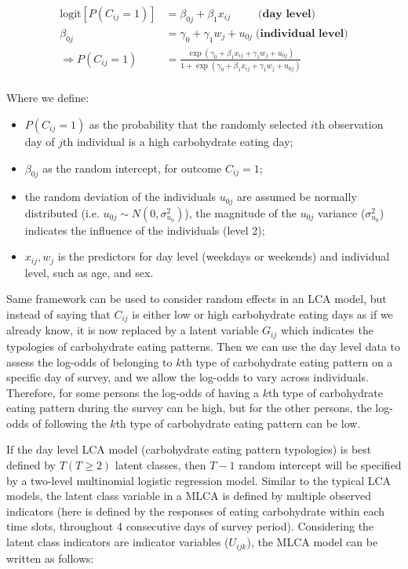 \begin{equation}
\begin{aligned}
\text{logit}[P(C_{ij} = 1)] & = \beta_{0j} + \beta_{1}x_{ij} \;\;\;\;\;\;\;\;\; \textbf{(day level)}  \\
\beta_{0j} & = \gamma_0 + \gamma_1 w_j + u_{0j} \; \textbf{(individual level)} \\ 
\Rightarrow P(C_{ij} = 1) & = \frac{\exp{(\gamma_0 + \beta_{1}x_{ij} + \gamma_1 w_j + u_{0j})}}{1 + \exp{(\gamma_0 + \beta_{1}x_{ij} + \gamma_1 w_j + u_{0j})}} \\
\end{aligned}
\label{randomLCA}
\end{equation}
\vspace{-0.3cm}

Where we define: 

\begin{itemize}
	\item $P(C_{ij} = 1)$ as the probability that the randomly selected $i$th observation day of $j$th individual is a high carbohydrate eating day;
	\item $\beta_{0j}$ as the random intercept, for outcome $C_{ij} = 1$; 
	\item the random deviation of the individuals $u_{0j}$ are assumed be normally distributed (i.e. $u_{0j} \sim N(0, \sigma_{u_0}^2)$), the magnitude of the $u_{0j}$ variance ($\sigma_{u_0}^2$) indicates the influence of the individuals (level 2);
	\item $x_{ij}, w_j$ is the predictors for day level (weekdays or weekends) and individual level, such as age, and sex.
\end{itemize}



Same framework can be used to consider random effects in an LCA model, but instead of saying that $C_{ij}$ is either low or high carbohydrate eating days as if we already know, it is now replaced by a latent variable $G_{ij}$ which indicates the typologies of carbohydrate eating patterns. Then we can use the day level data to assess the log-odds of belonging to $k$th type of carbohydrate eating pattern on a specific day of survey, and we allow the log-odds to vary across individuals. Therefore, for some persons the log-odds of having a $k$th type of carbohydrate eating pattern during the survey can be high, but for the other persons, the log-odds of following the $k$th type of carbohydrate eating pattern can be low. 

If the day level LCA model (carbohydrate eating pattern typologies) is best defined by $T (T \geqslant 2)$ latent classes, then $T-1$ random intercept will be specified by a two-level multinomial logistic regression model. Similar to the typical LCA models, the latent class variable in a MLCA is defined by multiple observed indicators (here is defined by the responses of eating carbohydrate within each time slots, throughout 4 consecutive days of survey period). Considering the latent class indicators are indicator variables ($U_{ijk}$), the MLCA model can be written as follows:\vspace{-1cm}

